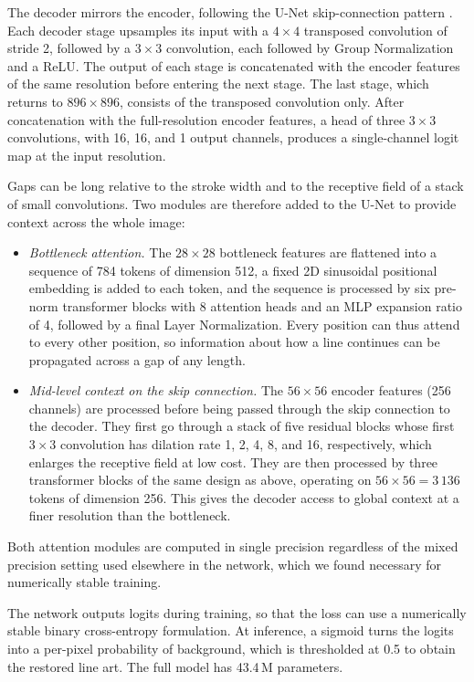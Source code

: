 \documentclass[11pt]{article}
\begin{document}
The decoder mirrors the encoder, following the U-Net skip-connection pattern
\citep{ronneberger2015unet}. Each decoder stage upsamples its input with a
$4\times 4$ transposed convolution of stride 2, followed by a $3\times 3$
convolution, each followed by Group Normalization and a ReLU. The output of each
stage is concatenated with the encoder features of the same resolution before
entering the next stage. The last stage, which returns to $896\times 896$, consists
of the transposed convolution only. After concatenation with the full-resolution
encoder features, a head of three $3\times 3$ convolutions, with 16, 16, and 1 output channels, produces a
single-channel logit map at the input resolution.  

Gaps can be long relative to the stroke width and to the receptive field of a stack
of small convolutions. Two modules are therefore added to the U-Net to provide
context across the whole image:
\begin{itemize}
\item \emph{Bottleneck attention.} The $28\times 28$ bottleneck features are
  flattened into a sequence of 784 tokens of dimension 512, a fixed 2D sinusoidal
  positional embedding is added to each token, and the sequence is processed by six
  pre-norm transformer blocks \citep{vaswani2017attention} with 8 attention heads
  and an MLP expansion ratio of 4, followed by a final Layer Normalization. Every
  position can thus attend to every other position, so information about how a
  line continues can be propagated across a gap of any length.
\item \emph{Mid-level context on the skip connection.} The $56\times 56$ encoder
  features (256 channels) are processed before being passed through the skip
  connection to the decoder. They first go through a stack of five residual blocks
  whose first $3\times 3$ convolution has dilation rate 1, 2, 4, 8, and 16,
  respectively, which enlarges the receptive field at low cost. They are then
  processed by three transformer blocks of the same design as above, operating on
  $56\times 56 = 3\,136$ tokens of dimension 256. This gives the decoder access to
  global context at a finer resolution than the bottleneck.
\end{itemize}
Both attention modules are computed in single precision regardless of the mixed
precision setting used elsewhere in the network, which we found necessary for
numerically stable training.

The network outputs logits during training, so that the loss can use a numerically
stable binary cross-entropy formulation. At inference, a sigmoid turns the logits
into a per-pixel probability of background, which is thresholded at 0.5 to obtain
the restored line art. The full model has 43.4\,M parameters.
\end{document}
